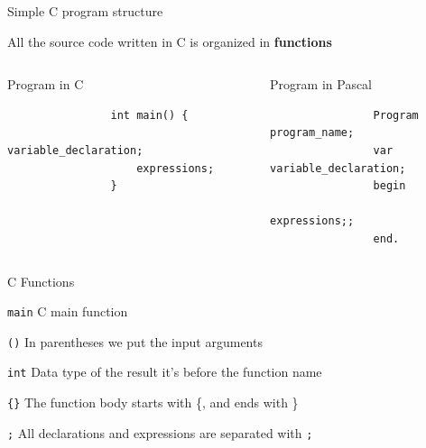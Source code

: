 \begin{frame}[fragile]{Simple C program structure}

    All the source code written in C is organized in \textbf{functions}
    \linebreak
    
    \begin{columns}[t]
            \begin{block}{Program in C}
                \begin{lstlisting}
                int main() {
                    variable_declaration;
                    expressions;                    
                }
                \end{lstlisting}
            \end{block}
            \begin{block}{Program in Pascal}
                \begin{lstlisting}
                Program program_name;
                var variable_declaration;
                begin
                    expressions;;
                end.
                \end{lstlisting}
            \end{block}
    \end{columns}

\end{frame}

\begin{frame}[shrink=10]{C Functions}
    \hfill
    \begin{block}{\texttt{main}}
         C main function
    \end{block}
    
    \begin{block}{\texttt{()}}
         In parentheses we put the input arguments
    \end{block}
    
    \begin{block}{\texttt{int}}
         Data type of the result it's before the function name
    \end{block}
    
    \begin{block}{\texttt{\{\}}}
         The function body starts with \{, and ends with \}
    \end{block}

    \begin{block}{\texttt{;}}
    All declarations and expressions are separated with \texttt{;}
    \end{block}

\end{frame}

